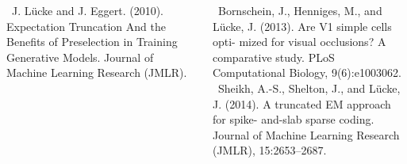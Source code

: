 \documentclass[final]{beamer}
\begin{document}
\begin{frame}{}
{\begin{columns}[t]
\begin{column}{.52\linewidth}
        \rbrack \  J. L\"ucke and J. Eggert. (2010). Expectation Truncation And the Benefits of Preselection in Training Generative 
            Models. Journal of Machine Learning Research (JMLR).
      \end{column}

    \vspace{-.7cm}
      \begin{column}{.45\linewidth}
        \scriptsize
        \rbrack \ Bornschein, J., Henniges, M., and Lücke, J. (2013). Are V1 simple cells opti-
mized for visual occlusions? A comparative study. PLoS Computational Biology, 9(6):e1003062.\\
        \rbrack \ Sheikh, A.-S., Shelton, J., and Lücke, J. (2014). A truncated EM approach for spike-
and-slab sparse coding. Journal of Machine Learning Research (JMLR), 15:2653–2687.
      \end{column}
    \end{columns}
    }
%
\end{frame}
\end{document}
